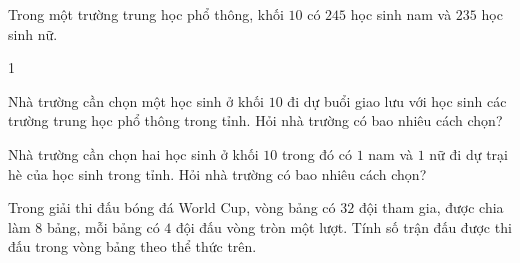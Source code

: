 \begin{bt}%
	Trong một trường trung học phổ thông, khối $ 10 $ có $ 245 $ học sinh nam và $ 235 $ học sinh nữ.
	\begin{enumEX}{1}
		\item Nhà trường cần chọn một học sinh ở khối $ 10 $ đi dự buổi giao lưu với học sinh các trường trung học phổ thông trong tỉnh. Hỏi nhà trường có bao nhiêu cách chọn?
		\item Nhà trường cần chọn hai học sinh ở khối $ 10 $ trong đó có $ 1 $ nam và $ 1 $ nữ đi dự trại hè của học sinh trong tỉnh. Hỏi nhà trường có bao nhiêu cách chọn?
	\end{enumEX}
\end{bt}

\begin{bt}%
	Trong giải thi đấu bóng đá World Cup, vòng bảng có $ 32 $ đội tham gia, được chia làm $ 8 $ bảng, mỗi bảng có $ 4 $ đội đấu vòng tròn một lượt. Tính số trận đấu được thi đấu trong vòng bảng theo thể thức trên.
\end{bt}

